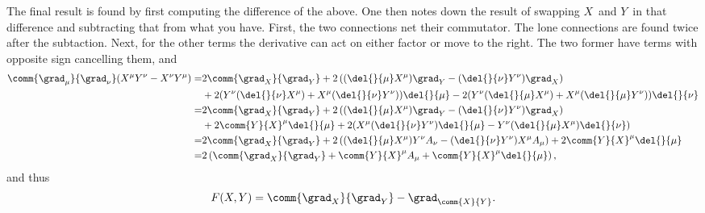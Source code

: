 The final result is found by first computing the difference of the above. One then notes down the result of swapping $X$ and $Y$ in that difference and subtracting that from what you have. First, the two connections net their commutator. The lone connections are found twice after the subtaction. Next, for the other terms the derivative can act on either factor or move to the right. The two former have terms with opposite sign cancelling them, and
\begin{align*}
	\comm{\grad_{\mu}}{\grad_{\nu}}(X^{\mu}Y^{\nu} - X^{\nu}Y^{\mu}) =& 2\comm{\grad_{X}}{\grad_{Y}} + 2\left((\del{}{\mu}X^{\mu})\grad_{Y} - (\del{}{\nu}Y^{\nu})\grad_{X}\right) \\
	&+ 2(Y^{\nu}(\del{}{\nu}X^{\mu}) + X^{\mu}(\del{}{\nu}Y^{\nu}))\del{}{\mu} - 2(Y^{\nu}(\del{}{\mu}X^{\mu}) + X^{\mu}(\del{}{\mu}Y^{\nu}))\del{}{\nu} \\
	=& 2\comm{\grad_{X}}{\grad_{Y}} + 2\left((\del{}{\mu}X^{\mu})\grad_{Y} - (\del{}{\nu}Y^{\nu})\grad_{X}\right) \\
	 &+ 2\comm{Y}{X}^{\mu}\del{}{\mu} + 2(X^{\mu}(\del{}{\nu}Y^{\nu})\del{}{\mu} - Y^{\nu}(\del{}{\mu}X^{\mu})\del{}{\nu}) \\
	=& 2\comm{\grad_{X}}{\grad_{Y}} + 2\left((\del{}{\mu}X^{\mu})Y^{\nu}A_{\nu} - (\del{}{\nu}Y^{\nu})X^{\mu}A_{\mu}\right) + 2\comm{Y}{X}^{\mu}\del{}{\mu} \\
	=& 2\left(\comm{\grad_{X}}{\grad_{Y}} + \comm{Y}{X}^{\mu}A_{\mu} + \comm{Y}{X}^{\mu}\del{}{\mu}\right),
\end{align*}
and thus
\begin{align*}
	F(X, Y) = \comm{\grad_{X}}{\grad_{Y}} - \grad_{\comm{X}{Y}}.
\end{align*}

